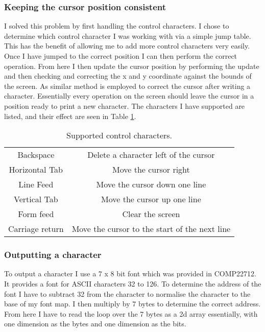 \subsubsection{Keeping the cursor position consistent}
I solved this problem by first handling the control characters. I chose to determine which control character I was working with via a simple jump table. This has the benefit of allowing me to add more control characters very easily. Once I have jumped to the correct position I can then perform the correct operation. From here I then update the cursor position by performing the update and then checking and correcting the x and y coordinate against the bounds of the screen. As similar method is employed to correct the cursor after writing a character. Essentially every operation on the screen should leave the cursor in a position ready to print a new character. The characters I have supported are listed, and their effect are seen in Table \ref{controlcharacters}.
\begin{table}[h!]
	\centering
	\caption{Supported control characters.\label{controlcharacters}}
	\begin{tabular}{|c|c|}
		\hline
		Backspace & Delete a character left of the cursor \\
		Horizontal Tab & Move the cursor right \\
		Line Feed & Move the cursor down one line \\
		Vertical Tab & Move the cursor up one line \\
		Form feed & Clear the screen \\
		Carriage return & Move the cursor to the start of the next line \\
		\hline
	\end{tabular}
\end{table}
\subsubsection{Outputting a character}
To output a character I use a 7 x 8 bit font which was provided in COMP22712. It provides a font for ASCII characters 32 to 126. To determine the address of the font I have to subtract 32 from the character to normalise the character to the base of my font map. I then multiply by 7 bytes to determine the correct address. From here I have to read the loop over the 7 bytes as a 2d array essentially, with one dimension as the bytes and one dimension as the bits.
